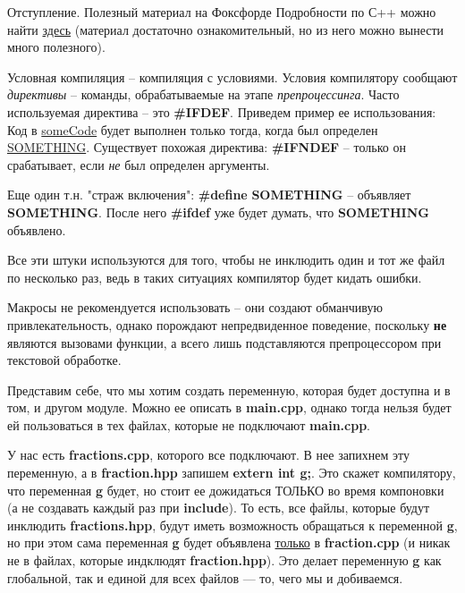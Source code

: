 \begin{lecture}[\lectureSubject]
\begin{lecSection}
		\begin{lecSubsection}{Отступление. Полезный материал на Фоксфорде}
		Подробности по С++ можно найти \href{https://foxford.ru/wiki/informatika/modulnoe-programmirovanie-v-c}{здесь} (материал достаточно ознакомительный, но из него можно вынести много полезного).
		\end{lecSubsection}
	
	\end{lecSection}
	\begin{lecSection}
		Условная компиляция -- компиляция с условиями. Условия компилятору сообщают \textit{директивы} -- команды, обрабатываемые на этапе \textit{препроцессинга}. Часто используемая директива -- это \textbf{\#IFDEF}. Приведем пример ее использования:
		Код в \underline{someCode} будет выполнен только тогда, когда был определен \underline{SOMETHING}. Существует похожая директива: \textbf{\#IFNDEF} -- только он срабатывает, если \textit{не} был определен аргументы.
		
		Еще один т.н. "страж включения": \textbf{\#define} \textbf{SOMETHING} -- объявляет \textbf{SOMETHING}. После него \textbf{\#ifdef} уже будет думать, что \textbf{SOMETHING} объявлено.
		
		Все эти штуки используются для того, чтобы не инклюдить один и тот же файл по несколько раз, ведь в таких ситуациях компилятор будет кидать ошибки.
	\end{lecSection}
	
	\begin{lecSection}[Макросы]
		Макросы не рекомендуется использовать -- они создают обманчивую привлекательность, однако порождают непредвиденное поведение, поскольку \textbf{не} являются вызовами функции, а всего лишь подставляются препроцессором при текстовой обработке.
	\end{lecSection}
	\begin{lecSection}
		Представим себе, что мы хотим создать переменную, которая будет доступна и в том, и другом модуле. Можно ее описать в \textbf{main.cpp}, однако тогда нельзя будет ей пользоваться в тех файлах, которые не подключают \textbf{main.cpp}. 
		
		У нас есть \textbf{fractions.cpp}, которого все подключают. В нее запихнем эту переменную, а в \textbf{fraction.hpp} запишем \textbf{extern int g;}. Это скажет компилятору, что переменная \textbf{g} будет, но стоит ее дожидаться ТОЛЬКО во время компоновки (а не создавать каждый раз при \textbf{include}). То есть, все файлы, которые будут инклюдить \textbf{fractions.hpp}, будут иметь возможность обращаться к переменной \textbf{g}, но при этом сама переменная \textbf{g} будет объявлена \underline{только} в \textbf{fraction.cpp} (и никак не в файлах, которые индклюдят \textbf{fraction.hpp}). Это делает переменную \textbf{g} как глобальной, так и единой для всех файлов --- то, чего мы и добиваемся.
	\end{lecSection}
\end{lecture}
